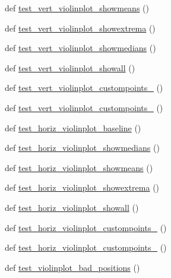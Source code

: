 \begin{DoxyCompactItemize}
def \hyperlink{namespacematplotlib_1_1tests_1_1test__axes_aa2054d3b620ca9d2219c335c5855aa20}{test\+\_\+vert\+\_\+violinplot\+\_\+showmeans} ()
\item 
def \hyperlink{namespacematplotlib_1_1tests_1_1test__axes_a83e63b16f08c3df830dc8804526b93c8}{test\+\_\+vert\+\_\+violinplot\+\_\+showextrema} ()
\item 
def \hyperlink{namespacematplotlib_1_1tests_1_1test__axes_ab88e2a0bcda794e29cf48b2cef219d01}{test\+\_\+vert\+\_\+violinplot\+\_\+showmedians} ()
\item 
def \hyperlink{namespacematplotlib_1_1tests_1_1test__axes_a7911b3cced501eadb7a9b6252ee96892}{test\+\_\+vert\+\_\+violinplot\+\_\+showall} ()
\item 
def \hyperlink{namespacematplotlib_1_1tests_1_1test__axes_a5cbdba93e78a2932d40571849c4d3b51}{test\+\_\+vert\+\_\+violinplot\+\_\+custompoints\+\_} ()
\item 
def \hyperlink{namespacematplotlib_1_1tests_1_1test__axes_abaaa4d5a666ee1936b1fb9d4c31d25d1}{test\+\_\+vert\+\_\+violinplot\+\_\+custompoints\+\_} ()
\item 
def \hyperlink{namespacematplotlib_1_1tests_1_1test__axes_a66276442dc769e07ca21ba462594cc74}{test\+\_\+horiz\+\_\+violinplot\+\_\+baseline} ()
\item 
def \hyperlink{namespacematplotlib_1_1tests_1_1test__axes_ae2fcd5b204d029e3f9c32d2d3c53c873}{test\+\_\+horiz\+\_\+violinplot\+\_\+showmedians} ()
\item 
def \hyperlink{namespacematplotlib_1_1tests_1_1test__axes_a0af03f47f11e7e815c43634e0e88cde3}{test\+\_\+horiz\+\_\+violinplot\+\_\+showmeans} ()
\item 
def \hyperlink{namespacematplotlib_1_1tests_1_1test__axes_a6a9ab490ef55c2ab3a140eabedd6ea20}{test\+\_\+horiz\+\_\+violinplot\+\_\+showextrema} ()
\item 
def \hyperlink{namespacematplotlib_1_1tests_1_1test__axes_abdae43842f64d8a681cb1faf4bb76fa7}{test\+\_\+horiz\+\_\+violinplot\+\_\+showall} ()
\item 
def \hyperlink{namespacematplotlib_1_1tests_1_1test__axes_a2426ec909bbdee8006d2b413199a6c91}{test\+\_\+horiz\+\_\+violinplot\+\_\+custompoints\+\_} ()
\item 
def \hyperlink{namespacematplotlib_1_1tests_1_1test__axes_abf00b1ac4f539d26414402b503508185}{test\+\_\+horiz\+\_\+violinplot\+\_\+custompoints\+\_} ()
\item 
def \hyperlink{namespacematplotlib_1_1tests_1_1test__axes_a19176ef46a78063984a09f5cff9d48ba}{test\+\_\+violinplot\+\_\+bad\+\_\+positions} ()

\end{DoxyCompactItemize}
